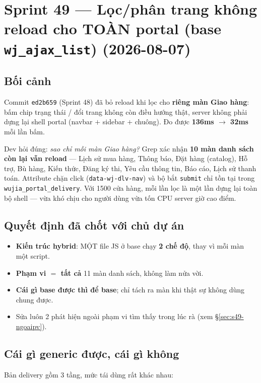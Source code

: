 \chapter{Sprint 49 --- Lọc/phân trang không reload cho TOÀN portal (base \texttt{wj\_ajax\_list}) (2026-08-07)}

\section{Bối cảnh}

Commit \texttt{ed2b659} (Sprint 48) đã bỏ reload khi lọc cho \textbf{riêng màn Giao hàng}:
bấm chip trạng thái / đổi trang không còn điều hướng thật, server không phải dựng lại shell
portal (navbar $+$ sidebar $+$ chuông). Đo được \textbf{136ms $\to$ 32ms} mỗi lần bấm.

Dev hỏi đúng: \emph{sao chỉ mỗi màn Giao hàng?} Grep xác nhận \textbf{10 màn danh sách còn lại
vẫn reload} --- Lịch sử mua hàng, Thông báo, Đặt hàng (catalog), Hỗ trợ, Bù hàng, Kiến thức,
Đăng ký thi, Yêu cầu thông tin, Báo cáo, Lịch sử thanh toán. Attribute chặn click
(\texttt{data-wj-dlv-nav}) và bộ bắt \texttt{submit} chỉ tồn tại trong
\texttt{wujia\_portal\_delivery}. Với 1500 cửa hàng, mỗi lần lọc là một lần dựng lại toàn bộ
shell --- vừa khó chịu cho người dùng vừa tốn CPU server giờ cao điểm.

\section{Quyết định đã chốt với chủ dự án}

\begin{itemize}
  \item \textbf{Kiến trúc hybrid}: MỘT file JS ở base chạy \textbf{2 chế độ}, thay vì mỗi màn
    một script.
  \item \textbf{Phạm vi $=$ tất cả} 11 màn danh sách, không làm nửa vời.
  \item \textbf{Cái gì base được thì để base}; chỉ tách ra màn khi thật sự không dùng chung được.
  \item Sửa luôn 2 phát hiện ngoài phạm vi tìm thấy trong lúc rà (xem \S\ref{sec:s49-ngoaipv}).
\end{itemize}

\section{Cái gì generic được, cái gì không}

Bản delivery gồm 3 tầng, mức tái dùng rất khác nhau:

